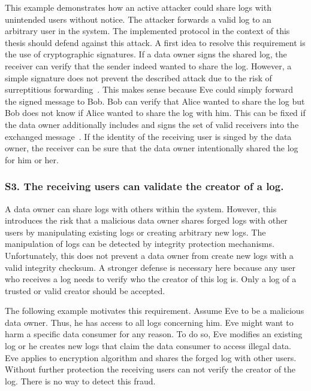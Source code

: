 \documentclass[../main.tex]{subfiles}
\begin{document}
This example demonstrates how an active attacker could share logs with unintended users without notice.
The attacker forwards a valid log to an arbitrary user in the system.
The implemented protocol in the context of this thesis should defend against this attack.
A first idea to resolve this requirement is the use of cryptographic signatures.
If a data owner signs the shared log, the receiver can verify that the sender indeed wanted to share the log.
However, a simple signature does not prevent the described attack due to the risk of surreptitious forwarding~\cite{Davis2001}.
This makes sense because Eve could simply forward the signed message to Bob.
Bob can verify that Alice wanted to share the log but Bob does not know if Alice wanted to share the log with him.
This can be fixed if the data owner additionally includes and signs the set of valid receivers into the exchanged message~\cite{Davis2001}.
If the identity of the receiving user is singed by the data owner, the receiver can be sure that the data owner intentionally shared the log for him or her.


\subsubsection{S3. The receiving users can validate the creator of a log.}

A data owner can share logs with others within the system.
However, this introduces the risk that a malicious data owner shares forged logs with other users by manipulating existing logs or creating arbitrary new logs.
The manipulation of logs can be detected by integrity protection mechanisms.
Unfortunately, this does not prevent a data owner from create new logs with a valid integrity checksum.
A stronger defense is necessary here because any user who receives a log needs to verify who the creator of this log is.
Only a log of a trusted or valid creator should be accepted.

The following example motivates this requirement.
Assume Eve to be a malicious data owner.
Thus, he has access to all logs concerning him.
Eve might want to harm a specific data consumer for any reason.
To do so, Eve modifies an existing log or he creates new logs that claim the data consumer to access illegal data.
Eve applies to encryption algorithm and shares the forged log with other users.
Without further protection the receiving users can not verify the creator of the log.
There is no way to detect this fraud.
\end{document}
